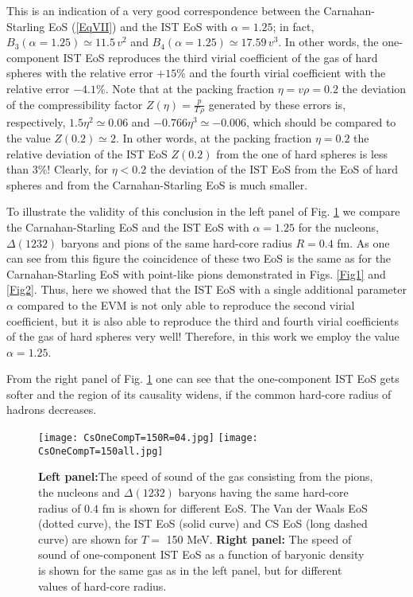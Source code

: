 \documentclass[12pt]{article}
\begin{document}
This is an indication of a very good correspondence between the Carnahan-Starling EoS  (\ref{EqVII}) and the IST EoS with $\alpha=1.25$; in fact, $B_3 (\alpha =1.25) \simeq 11.5\, v^2$ and $B_4 (\alpha =1.25) \simeq 17.59\, v^3$. In other words,  the one-component IST EoS reproduces the third virial coefficient of the gas of hard spheres with the relative error $+15$\%  and the fourth virial coefficient with  the relative error  $-4.1$\%.  Note that  at the packing fraction $\eta = v \rho =0.2$ the deviation of the compressibility factor $Z(\eta) = \frac{p}{T \, \rho}$ generated by these errors is, respectively,  $1.5 \eta^2 \simeq 0.06$ and $-0.766  \eta^3 \simeq -0.006$, which should be compared to the value $Z(0.2) \simeq 2$. In other words,  at the packing fraction $\eta =0.2$ the relative deviation  of the IST EoS $Z(0.2)$ from the one of hard spheres  is less than 3\%! Clearly, for $\eta < 0.2$ the deviation of  the IST EoS from the EoS of hard spheres and from the Carnahan-Starling EoS  is  much smaller.  

To illustrate the validity of this conclusion in the left panel of  Fig. \ref{Fig3}
we compare the Carnahan-Starling EoS and the IST EoS with $\alpha =1.25$ for  the nucleons, $\Delta (1232)$  baryons  and pions of the same hard-core radius $R=0.4$ fm. As one can see from this figure the coincidence of these two EoS is the same as for the Carnahan-Starling EoS with point-like pions demonstrated in Figs.  \ref{Fig1} and \ref{Fig2}.
Thus,  here we showed that the IST EoS with a single additional parameter $\alpha$ compared to the EVM is not only able to reproduce the second virial coefficient, but it is also able  to reproduce the third and fourth  virial coefficients of the gas of  hard spheres very well! 
Therefore, in this work we employ the value  $\alpha =1.25$.  

From the right panel of   Fig. \ref{Fig3} one can see that  the one-component IST  EoS gets softer and the region of  its causality widens, if  the common hard-core radius of hadrons  decreases.  



\begin{figure}[htbp]
\centerline{ \hspace*{11mm}
\texttt{[image: CsOneCompT=150R=04.jpg]}
  \hspace*{-4mm}
\texttt{[image: CsOneCompT=150all.jpg]}
 } 
 \caption{{\bf Left panel:}The speed of sound of  the gas consisting from the pions,  the nucleons and $\Delta (1232)$  baryons  having the same hard-core radius of $0.4$ fm  is shown for different EoS.  The  Van der Waals  EoS (dotted curve), the IST EoS (solid curve)  and CS EoS (long dashed curve) are shown 
  for $T=$ 150 MeV. {\bf Right panel:} The speed of sound of one-component IST EoS  as a function of baryonic density is shown for the same gas as in the left panel, but  for   different values of hard-core radius.}
  \label{Fig3}
\end{figure}
\end{document}
